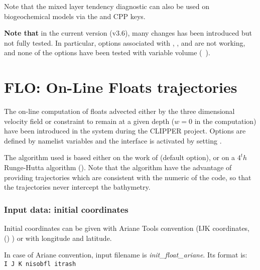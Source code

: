 \documentclass[../main/NEMO_manual]{subfiles}
\begin{document}
Note that the mixed layer tendency diagnostic can also be used on biogeochemical models via
the  and  CPP keys.

\textbf{Note that} in the current version (v3.6), many changes has been introduced but not fully tested.
In particular, options associated with , , and  are not working,
and none of the options have been tested with variable volume (\ie\ ).

\section[FLO: On-Line Floats trajectories]{FLO: On-Line Floats trajectories}
\label{sec:DIA_FLO}

\begin{listing}
  \caption{}
  \label{lst:namflo}
\end{listing}

The on-line computation of floats advected either by the three dimensional velocity field or constraint to
remain at a given depth ($w = 0$ in the computation) have been introduced in the system during the CLIPPER project.
Options are defined by  namelist variables and the interface is activated by setting .

The algorithm used is based either on the work of \cite{blanke.raynaud_JPO97} (default option),
or on a $4^th$ Runge-Hutta algorithm ().
Note that the \cite{blanke.raynaud_JPO97} algorithm have the advantage of providing trajectories which
are consistent with the numeric of the code, so that the trajectories never intercept the bathymetry.

\subsubsection{Input data: initial coordinates}

Initial coordinates can be given with Ariane Tools convention
(IJK coordinates, () ) or with longitude and latitude.

In case of Ariane convention, input filename is \textit{init\_float\_ariane}.
Its format is: \\
{ \texttt{I J K nisobfl itrash}}
\end{document}
